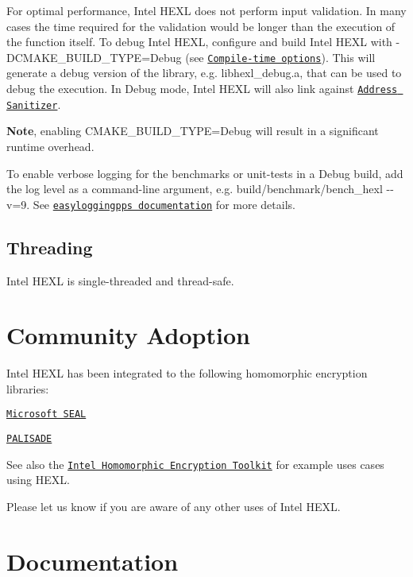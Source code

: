 For optimal performance, Intel H\+E\+XL does not perform input validation. In many cases the time required for the validation would be longer than the execution of the function itself. To debug Intel H\+E\+XL, configure and build Intel H\+E\+XL with {\ttfamily -\/\+D\+C\+M\+A\+K\+E\+\_\+\+B\+U\+I\+L\+D\+\_\+\+T\+Y\+PE=Debug} (see \href{#compile-time-options}{\tt Compile-\/time options}). This will generate a debug version of the library, e.\+g. {\ttfamily libhexl\+\_\+debug.\+a}, that can be used to debug the execution. In Debug mode, Intel H\+E\+XL will also link against \href{https://github.com/google/sanitizers/wiki/AddressSanitizer}{\tt Address Sanitizer}.

{\bfseries Note}, enabling {\ttfamily C\+M\+A\+K\+E\+\_\+\+B\+U\+I\+L\+D\+\_\+\+T\+Y\+PE=Debug} will result in a significant runtime overhead.

To enable verbose logging for the benchmarks or unit-\/tests in a Debug build, add the log level as a command-\/line argument, e.\+g. {\ttfamily build/benchmark/bench\+\_\+hexl -\/-\/v=9}. See \href{https://github.com/amrayn/easyloggingpp#application-arguments}{\tt easyloggingpp\textquotesingle{}s documentation} for more details.

\subsection*{Threading}

Intel H\+E\+XL is single-\/threaded and thread-\/safe.

\section*{Community Adoption}

Intel H\+E\+XL has been integrated to the following homomorphic encryption libraries\+:
\begin{DoxyItemize}
\item \href{https://github.com/microsoft/SEAL}{\tt Microsoft S\+E\+AL}
\item \href{https://gitlab.com/palisade/palisade-release}{\tt P\+A\+L\+I\+S\+A\+DE}
\end{DoxyItemize}

See also the \href{https://github.com/intel/he-toolkit}{\tt Intel Homomorphic Encryption Toolkit} for example uses cases using H\+E\+XL.

Please let us know if you are aware of any other uses of Intel H\+E\+XL.

\section*{Documentation}


